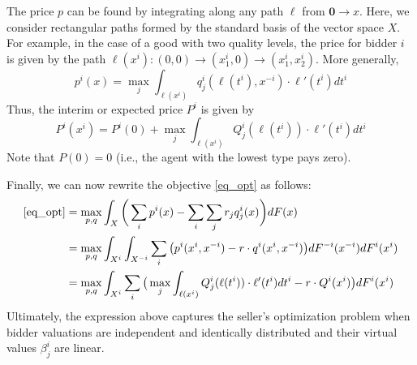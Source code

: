 \documentclass{article}
\begin{document}
The price $p$ can be found by integrating along any path $\ell$ from $\mathbf{0} \to x$. Here, we consider rectangular paths formed by the standard basis of the vector space $X$. For example, in the case of a good with two quality levels, the price for bidder $i$ is given by the path $\ell(x^i) : (0,0) \to (x_1^i,0) \to (x_1^i,x_2^i)$. More generally,
\begin{equation}
    p^i(x) = \max_j \int_{\ell(x^i)} q_j^i(\ell(t^i), x^{-i}) \cdot \ell'(t^i) dt^i
\end{equation}
\noindent Thus, the interim or expected price $P^i$ is given by
\begin{equation}
    P^i(x^i) = P^i(0) + \max_j \int_{\ell(x^i)} Q_j^i(\ell(t^i)) \cdot \ell'(t^i) dt^i 
\end{equation}
\noindent Note that $P(0)=0$ (i.e., the agent with the lowest type pays zero).

Finally, we can now rewrite the objective \ref{eq_opt} as follows:
\begin{align}
    \ref{eq_opt} &= \max_{p,q} \int_X \bigg( \sum_i p^i(x)  - \sum_i \sum_j r_j q_j^i(x) \bigg) dF(x) \\
        &= \max_{p,q} \int_{X^i} \int_{X^{-i}} \sum_i \big( p^i(x^i, x^{-i}) - r \cdot q^i(x^i, x^{-i}) \big) dF^{-i}(x^{-i}) dF^i(x^i) \\
        &= \max_{p,q} \int_{X^i} \sum_i \big( \max_j \int_{\ell(x^i)} Q_j^i(\ell(t^i)) \cdot \ell'(t^i) dt^i  - r \cdot Q^i(x^i) \big) dF^i(x^i)
\end{align}
\noindent Ultimately, the expression above captures the seller's optimization problem when bidder valuations are independent and identically distributed and their virtual values $\beta_j^i$ are linear.



\end{document}
